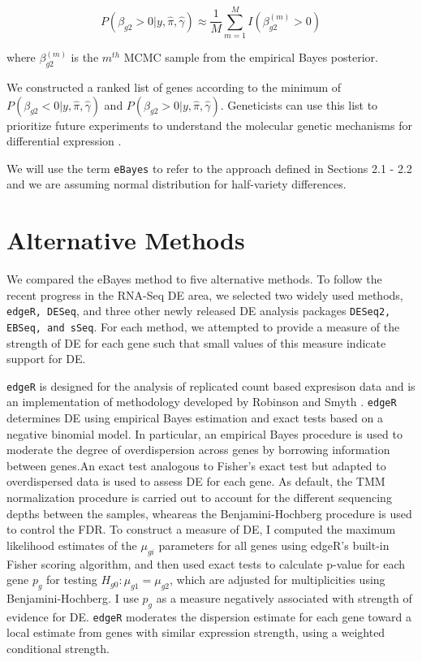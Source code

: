 $$P(\beta_{g2}> 0 | y, \hat{\pi}, \hat{\gamma}) \approx \frac{1}{M} \sum_{m=1}^M I(\beta_{g2} ^ {(m)} > 0) $$

where $\beta_{g2}^{(m)}$ is the $m^{th}$ MCMC sample from the empirical Bayes posterior.



We constructed a ranked list of genes according to the minimum of $P(\beta_{g2}< 0 | y, \hat{\pi}, \hat{\gamma})$ and $P(\beta_{g2}> 0 | y, \hat{\pi}, \hat{\gamma})$. Geneticists can use this list to prioritize future experiments to understand the molecular genetic mechanisms for differential expression \citep{niemi2015empirical}. 

We will use the term {\tt eBayes} to refer to the approach defined in Sections 2.1 - 2.2 and we are assuming normal distribution for half-variety differences.

\section{Alternative Methods}

We compared the eBayes method to five alternative methods. To follow the recent progress in the RNA-Seq DE area, we selected two widely used methods, {\tt edgeR, DESeq}, and three other newly released DE analysis packages {\tt DESeq2, EBSeq, and sSeq}. For each method, we attempted to provide a measure of the strength of DE for each gene such that small values of this measure indicate support for DE. 


{\tt edgeR} is designed for the analysis of replicated count based expresison data and is an implementation of methodology developed by Robinson and Smyth \citep{robinson2007moderated}. {\tt edgeR} determines DE using empirical Bayes estimation and exact tests based on a negative binomial model. In particular, an empirical Bayes procedure is used to moderate the degree of overdispersion across genes by borrowing information between genes.An exact test analogous to Fisher's exact test but adapted to overdispersed data is used to assess DE for each gene. As default, the TMM normalization procedure is carried out to account for the different sequencing depths between the samples, wheareas the Benjamini-Hochberg procedure is used to control the FDR\citep{seyednasrollah2013comparison}. To construct a measure of DE, I computed the maximum likelihood estimates of the $\mu_{gi}$ parameters for all genes using edgeR's built-in Fisher scoring algorithm, and then used exact tests to calculate p-value for each gene $p_g$ for testing $H_{g0}: \mu_{g1} = \mu_{g2}$, which are adjusted for multiplicities using Benjamini-Hochberg. I use $p_g$ as a measure negatively associated with strength of evidence for DE. {\tt edgeR} moderates the dispersion estimate for each gene toward a local estimate from genes with similar expression strength, using a weighted conditional strength.

